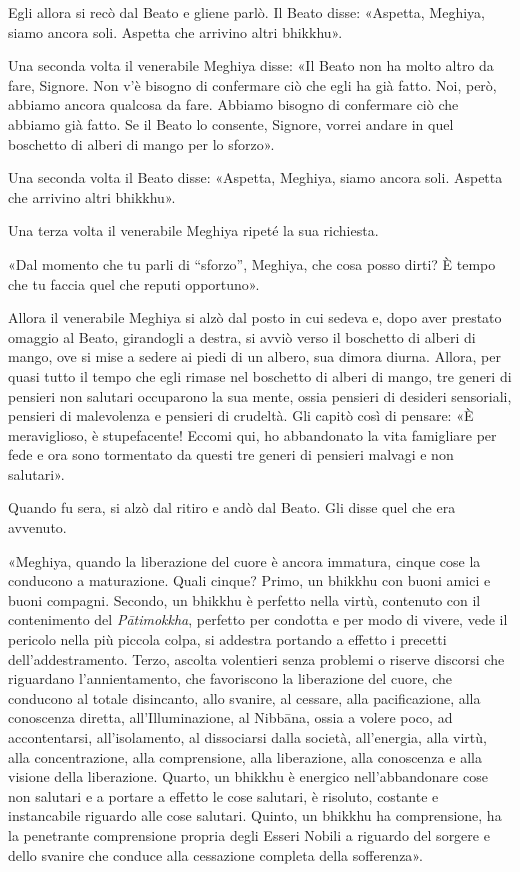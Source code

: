 Egli allora si recò dal Beato e gliene parlò. Il Beato disse: «Aspetta,
Meghiya, siamo ancora soli. Aspetta che arrivino altri bhikkhu».


Una seconda volta il venerabile Meghiya disse: «Il Beato non ha molto
altro da fare, Signore. Non v’è bisogno di confermare ciò che egli ha
già fatto. Noi, però, abbiamo ancora qualcosa da fare. Abbiamo bisogno
di confermare ciò che abbiamo già fatto. Se il Beato lo consente,
Signore, vorrei andare in quel boschetto di alberi di mango per lo
sforzo».


Una seconda volta il Beato disse: «Aspetta, Meghiya, siamo ancora soli.
Aspetta che arrivino altri bhikkhu».


Una terza volta il venerabile Meghiya ripeté la sua richiesta.


«Dal momento che tu parli di “sforzo”, Meghiya, che cosa posso dirti? È
tempo che tu faccia quel che reputi opportuno».


Allora il venerabile Meghiya si alzò dal posto in cui sedeva e, dopo
aver prestato omaggio al Beato, girandogli a destra, si avviò verso il
boschetto di alberi di mango, ove si mise a sedere ai piedi di un
albero, sua dimora diurna. Allora, per quasi tutto il tempo che egli
rimase nel boschetto di alberi di mango, tre generi di pensieri non
salutari occuparono la sua mente, ossia pensieri di desideri sensoriali,
pensieri di malevolenza e pensieri di crudeltà. Gli capitò così di
pensare: «È meraviglioso, è stupefacente! Eccomi qui, ho abbandonato la
vita famigliare per fede e ora sono tormentato da questi tre generi di
pensieri malvagi e non salutari».


Quando fu sera, si alzò dal ritiro e andò dal Beato. Gli disse quel che
era avvenuto.


«Meghiya, quando la liberazione del cuore è ancora immatura, cinque cose
la conducono a maturazione. Quali cinque? Primo, un bhikkhu con buoni
amici e buoni compagni. Secondo, un bhikkhu è perfetto nella virtù,
contenuto con il contenimento del \emph{Pātimokkha}, perfetto per condotta e
per modo di vivere, vede il pericolo nella più piccola colpa, si
addestra portando a effetto i precetti dell’addestramento. Terzo,
ascolta volentieri senza problemi o riserve discorsi che riguardano
l’annientamento, che favoriscono la liberazione del cuore, che conducono
al totale disincanto, allo svanire, al cessare, alla pacificazione, alla
conoscenza diretta, all’Illuminazione, al Nibbāna, ossia a volere poco,
ad accontentarsi, all’isolamento, al dissociarsi dalla società,
all’energia, alla virtù, alla concentrazione, alla comprensione, alla
liberazione, alla conoscenza e alla visione della liberazione. Quarto,
un bhikkhu è energico nell’abbandonare cose non salutari e a portare a
effetto le cose salutari, è risoluto, costante e instancabile riguardo
alle cose salutari. Quinto, un bhikkhu ha comprensione, ha la penetrante
comprensione propria degli Esseri Nobili a riguardo del sorgere e dello
svanire che conduce alla cessazione completa della sofferenza».


